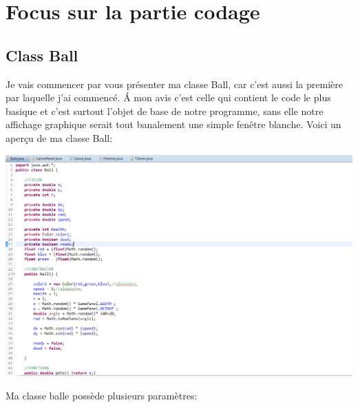 \documentclass{article}
\begin{document}

\section{Focus sur la partie codage}
\subsection{Class Ball}
Je vais commencer par vous présenter ma classe Ball, car c'est aussi la première par laquelle j'ai commencé. \'A mon avis c'est celle qui contient le code le plus basique et c'est surtout l'objet de base de notre programme, sans elle notre affichage graphique serait tout banalement une simple fenêtre blanche. \vspace{5mm} \newline
Voici un aperçu de ma classe Ball:
\begin{center}
  \includegraphics[scale=0.5]{BallApercu2.png}
\end{center}

Ma classe balle possède plusieurs paramètres:
\end{document}

